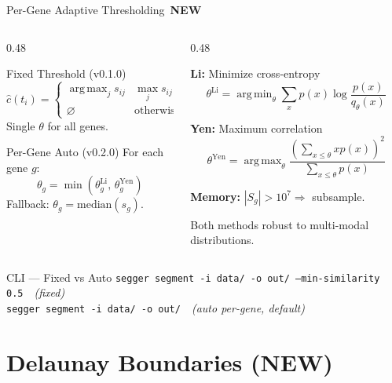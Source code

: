 \documentclass[aspectratio=169,10pt]{beamer}
\DeclareMathOperator*{\argmax}{arg\,max}
\DeclareMathOperator*{\argmin}{arg\,min}
\newcommand{\NEW}{\,{\scriptsize\colorbox{newgreen}{\color{white}\textbf{NEW}}}\,}
\begin{document}
\begin{frame}{Per-Gene Adaptive Thresholding \NEW}

\begin{columns}[T]
\begin{column}{0.48\textwidth}
\begin{block}{Fixed Threshold (v0.1.0)}
\vspace{-0.2cm}
\[
  \hat{c}(t_i) = \begin{cases} \argmax_j s_{ij} & \max_j s_{ij} \geq \theta \\ \varnothing & \text{otherwise} \end{cases}
\]
Single $\theta$ for all genes.
\end{block}

\begin{alertblock}{Per-Gene Auto (v0.2.0)}
For each gene $g$:
\vspace{-0.2cm}
\[
  \theta_g = \min(\theta_g^{\text{Li}},\, \theta_g^{\text{Yen}})
\]
Fallback: $\theta_g = \text{median}(s_g)$.
\end{alertblock}
\end{column}

\begin{column}{0.48\textwidth}
{\small
\textbf{Li:} Minimize cross-entropy
\[
  \theta^{\text{Li}} = \argmin_\theta \sum_x p(x) \log\frac{p(x)}{q_\theta(x)}
\]

\textbf{Yen:} Maximum correlation
\[
  \theta^{\text{Yen}} = \argmax_\theta \frac{(\sum_{x \leq \theta} x p(x))^2}{\sum_{x \leq \theta} p(x)}
\]

\textbf{Memory:} $|S_g| > 10^7 \Rightarrow$ subsample.

Both methods robust to multi-modal distributions.
}
\end{column}
\end{columns}

\vspace{0.1cm}
\begin{exampleblock}{CLI --- Fixed vs Auto}
\centering
{\small\texttt{segger segment -i data/ -o out/ --min-similarity 0.5}\ \ \textit{(fixed)} \\
\texttt{segger segment -i data/ -o out/}\ \ \textit{(auto per-gene, default)}}
\end{exampleblock}
\end{frame}

\section{Delaunay Boundaries (NEW)}
\end{document}
